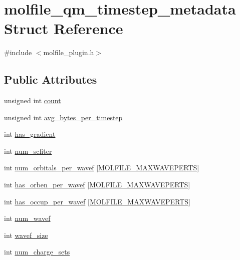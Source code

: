 \hypertarget{structmolfile__qm__timestep__metadata}{\section{molfile\-\_\-qm\-\_\-timestep\-\_\-metadata \-Struct \-Reference}
\label{structmolfile__qm__timestep__metadata}
}


{\ttfamily \#include $<$molfile\-\_\-plugin.\-h$>$}

\subsection*{\-Public \-Attributes}
\begin{DoxyCompactItemize}
\item 
unsigned int \hyperlink{structmolfile__qm__timestep__metadata_a6706e92c87f2759b452130817bf07906}{count}
\item 
unsigned int \hyperlink{structmolfile__qm__timestep__metadata_aee73a56bde14b28027a675fc0f35b966}{avg\-\_\-bytes\-\_\-per\-\_\-timestep}
\item 
int \hyperlink{structmolfile__qm__timestep__metadata_a916247997da0afd2dfe700ab9f268170}{has\-\_\-gradient}
\item 
int \hyperlink{structmolfile__qm__timestep__metadata_a4e7783257a629101ac0af86272df620b}{num\-\_\-scfiter}
\item 
int \hyperlink{structmolfile__qm__timestep__metadata_ac8c5cc92d4a4f5c5214b15fcce1b6f29}{num\-\_\-orbitals\-\_\-per\-\_\-wavef} \mbox{[}\hyperlink{molfile__plugin_8h_ace4225b76d0ecfd0f7c7d5af0cf4e55d}{\-M\-O\-L\-F\-I\-L\-E\-\_\-\-M\-A\-X\-W\-A\-V\-E\-P\-E\-R\-T\-S}\mbox{]}
\item 
int \hyperlink{structmolfile__qm__timestep__metadata_a495c33e580a5271b3c4380e09953f12b}{has\-\_\-orben\-\_\-per\-\_\-wavef} \mbox{[}\hyperlink{molfile__plugin_8h_ace4225b76d0ecfd0f7c7d5af0cf4e55d}{\-M\-O\-L\-F\-I\-L\-E\-\_\-\-M\-A\-X\-W\-A\-V\-E\-P\-E\-R\-T\-S}\mbox{]}
\item 
int \hyperlink{structmolfile__qm__timestep__metadata_a781a991e5f3ff417b9060bca6dfa63ca}{has\-\_\-occup\-\_\-per\-\_\-wavef} \mbox{[}\hyperlink{molfile__plugin_8h_ace4225b76d0ecfd0f7c7d5af0cf4e55d}{\-M\-O\-L\-F\-I\-L\-E\-\_\-\-M\-A\-X\-W\-A\-V\-E\-P\-E\-R\-T\-S}\mbox{]}
\item 
int \hyperlink{structmolfile__qm__timestep__metadata_a23b966cad1751b3063a2c4c7e812e3e9}{num\-\_\-wavef}
\item 
int \hyperlink{structmolfile__qm__timestep__metadata_a9d9a6788a8e7b19f4be71b9b4ef5fe43}{wavef\-\_\-size}
\item 
int \hyperlink{structmolfile__qm__timestep__metadata_a4c5bf87213909fd4f96b1186aa3161c0}{num\-\_\-charge\-\_\-sets}
\end{DoxyCompactItemize}


